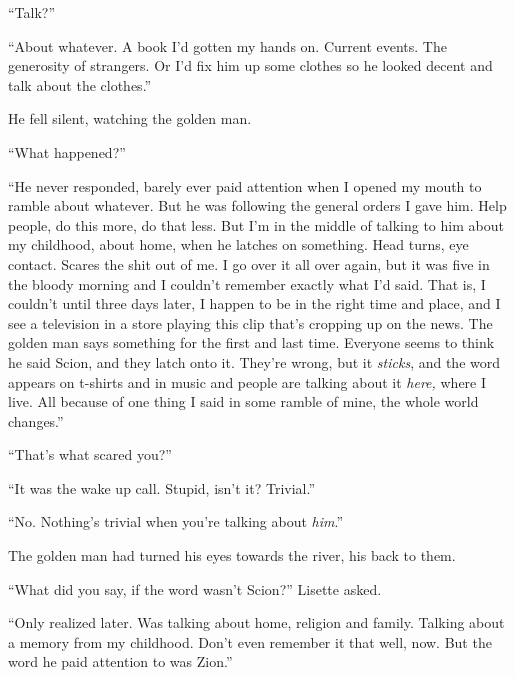 ``Talk?''



``About whatever.  A book I'd gotten my hands on.  Current events.  The generosity of strangers.  Or I'd fix him up some clothes so he looked decent and talk about the clothes.''



He fell silent, watching the golden man.



``What happened?''



``He never responded, barely ever paid attention when I opened my mouth to ramble about whatever.  But he was following the general orders I gave him.  Help people, do this more, do that less.  But I'm in the middle of talking to him about my childhood, about home, when he latches on something.  Head turns, eye contact.  Scares the shit out of me.  I go over it all over again, but it was five in the bloody morning and I couldn't remember exactly what I'd said.  That is, I couldn't until three days later, I happen to be in the right time and place, and I see a television in a store playing this clip that's cropping up on the news.  The golden man says something for the first and last time.  Everyone seems to think he said Scion, and they latch onto it.  They're wrong, but it \emph{sticks}, and the word appears on t-shirts and in music and people are talking about it \emph{here, }where I live.  All because of one thing I said in some ramble of mine, the whole world changes.''



``That's what scared you?''



``It was the wake up call.  Stupid, isn't it?  Trivial.''



``No.  Nothing's trivial when you're talking about \emph{him}.''



The golden man had turned his eyes towards the river, his back to them.



``What did you say, if the word wasn't Scion?'' Lisette asked.



``Only realized later.  Was talking about home, religion and family.  Talking about a memory from my childhood.  Don't even remember it that well, now.  But the word he paid attention to was Zion.''



